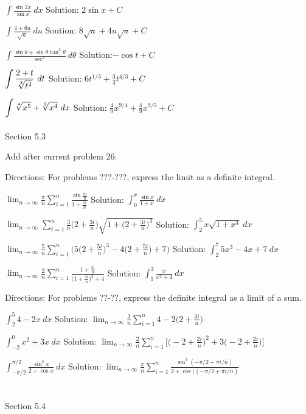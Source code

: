 \documentclass[10pt]{article}
\newcommand{\ds}{\displaystyle}
\begin{document}
$\ds \int \frac {\sin 2x}{\sin x}~dx$			Solution: $2\sin x+C$

$\ds \int \frac{4+6u}{\sqrt u}~du$			Soution: $8\sqrt u+4u\sqrt u+C$

$\ds \int \frac{\sin\theta+\sin\theta\tan^2\theta}{\sec^2}~d\theta$		Solution:$-\cos t +C$

$\ds \int \frac{2+t}{\root 3 \of{t^2}}~dt$		Solution: $6t^{1/3}+\frac34 t^{4/3}+C$

$\ds \int \root 4 \of{x^5} +\root 5 \of {x^4}~dx$	Solution: $\frac49 x^{9/4}+\frac49 x^{9/5}+C$\\ \\


Section 5.3

Add after current problem 26:

Directions: For problems ???-???, express the limit as a definite integral.

$\ds \lim_{n\to\infty} \frac{\pi}{n} \sum_{i=1}^n \frac{\sin \frac{\pi i}{n}}{1+\frac{\pi i}{n}}$ 	Solution: $\ds \int_0^{\pi} \frac{\sin x}{1+x}~dx$

$\ds \lim_{n\to\infty} \sum_{i=1}^n \frac{3}{n} \biggl(2+\frac{3i}{n}\biggr)\sqrt{1+\biggl(2+\frac{3i}{n}\biggr)^3}$	Solution: $\ds \int_2^5 x\sqrt{1+x^3}~dx$

$\ds \lim_{n\to\infty} \frac{5}{n} \sum_{i=1}^n \biggl(5\biggl(2+\frac{5i}{n}\biggr)^3-4\biggl(2+\frac{5i}{n}\biggr)+7\biggr)$
	Solution: $\ds \int_2^7 5x^3-4x+7~dx$

$\ds  \lim_{n\to\infty} \frac{2}{n} \sum_{i=1}^n \frac{1+\frac{2i}{n}}{\biggl(1+\frac{2i}{n}\biggr)^2+4}$
	Solution: $\ds \int_1^3 \frac{x}{x^2+4}~dx$

Directions: For problems ??-??, express the definite integral as a limit of a sum.

$\ds \int_2^5 4-2x~dx$		Solution: $\ds \lim_{n\to\infty} \frac{3}{n} \sum_{i=1}^n 4-2\biggl(2+\frac{3i}{n}\biggr)$

$\ds \int_{-2}^0 x^2+3x~dx$	Solution: $\ds \lim_{n\to\infty} \frac{2}{n} \sum_{i=1}^n \biggl[\biggl(-2+\frac{2i}{n}\biggr)^2+3\biggl(-2+\frac{2i}{n}\biggr)\biggr]$

$\ds \int_{-\pi/2}^{\pi/2} \frac{\sin^3 x}{2+\cos x}~dx$		Solution:  $\ds \lim_{n\to\infty} \frac{\pi}{n} \sum_{i=1}^n \frac{\sin^3(-\pi/2+\pi i/n)}{2+\cos ((-\pi/2+\pi i/n)}$  \\ \\ \\


Section 5.4
\end{document}
